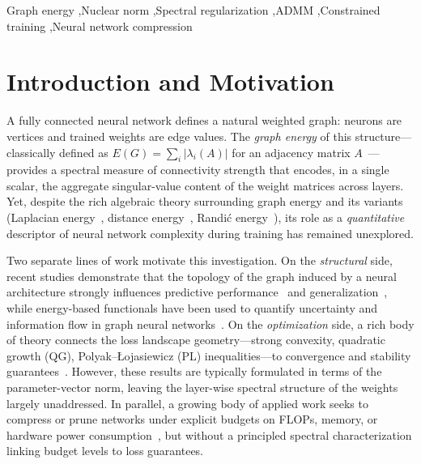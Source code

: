 \documentclass[a4paper,fleqn]{cas-sc}
\theoremstyle{remark}
\theoremstyle{definition}
\begin{document}
\begin{keywords}
Graph energy \sep Nuclear norm \sep Spectral regularization \sep ADMM \sep Constrained training \sep Neural network compression
\end{keywords}



\maketitle

\section{Introduction and Motivation}\label{sec:intro}

A fully connected neural network defines a natural weighted graph: neurons are vertices and trained weights are edge values. The \emph{graph energy} of this structure---classically defined as $E(G)=\sum_i|\lambda_i(A)|$ for an adjacency matrix $A$~\cite{Gutman1978,Gutman2012}---provides a spectral measure of connectivity strength that encodes, in a single scalar, the aggregate singular-value content of the weight matrices across layers. Yet, despite the rich algebraic theory surrounding graph energy and its variants (Laplacian energy~\cite{GutmanZhou2006}, distance energy~\cite{Indulal2008DistanceEnergy}, Randi\'c energy~\cite{Bozkurt2010RandicEnergy}), its role as a \emph{quantitative} descriptor of neural network complexity during training has remained unexplored.

Two separate lines of work motivate this investigation. On the \emph{structural} side, recent studies demonstrate that the topology of the graph induced by a neural architecture strongly influences predictive performance~\cite{you2020graph} and generalization~\cite{arya2025effects}, while energy-based functionals have been used to quantify uncertainty and information flow in graph neural networks~\cite{Acharya2025GraphEnergy,Fuchsgruber2024GEBM}. On the \emph{optimization} side, a rich body of theory connects the loss landscape geometry---strong convexity, quadratic growth (QG), Polyak--{\L}ojasiewicz (PL) inequalities---to convergence and stability guarantees~\cite{Nesterov2004,Karimi2016QGPL,Attouch2013KL,Martens2020}. However, these results are typically formulated in terms of the parameter-vector norm, leaving the layer-wise spectral structure of the weights largely unaddressed. In parallel, a growing body of applied work seeks to compress or prune networks under explicit budgets on FLOPs, memory, or hardware power consumption~\cite{Yang2019ECC,Chen2018ConstraintAware,Zeng2023DepthEnergy}, but without a principled spectral characterization linking budget levels to loss guarantees.
\end{document}
